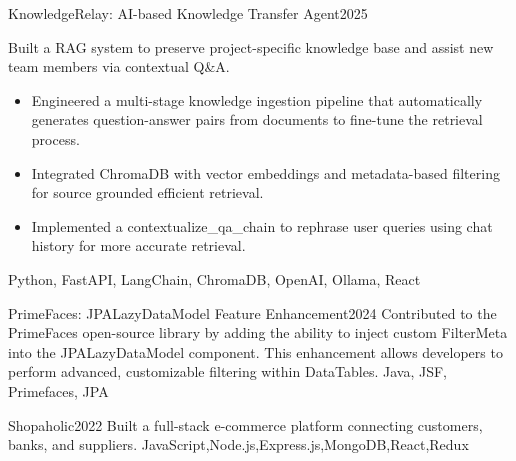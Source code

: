 %
%
%


\begin{projects}
        \project
        {KnowledgeRelay: AI-based Knowledge Transfer Agent}{2025}
        {}
        	{
            Built a RAG system to preserve project-specific knowledge base and assist new team members via contextual Q\&A.
              \begin{itemize}
                    \item Engineered a multi-stage knowledge ingestion pipeline that automatically generates question-answer pairs from documents to fine-tune the retrieval process.

                    \item Integrated ChromaDB with vector embeddings and metadata-based filtering for source grounded efficient retrieval.
                    
                    \item Implemented a contextualize\_qa\_chain to rephrase user queries using chat history for more accurate retrieval.
              \end{itemize}
}
	{Python, FastAPI, LangChain, ChromaDB, OpenAI, Ollama, React}



        \project
        {PrimeFaces: JPALazyDataModel Feature Enhancement}{2024}
        {}
        	{Contributed to the PrimeFaces open-source library by adding the ability to inject custom FilterMeta into the JPALazyDataModel component. This enhancement allows developers to perform advanced, customizable filtering within DataTables.}
	{Java, JSF, Primefaces, JPA}

    
	\project
	{Shopaholic}{2022}
        {}
        	{Built a full-stack e-commerce platform connecting customers, banks, and suppliers.}
	{JavaScript,Node.js,Express.js,MongoDB,React,Redux}
 

\end{projects}
